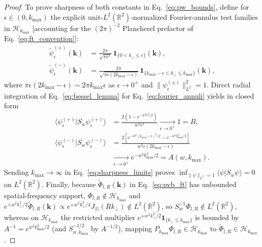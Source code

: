 \documentclass[aps,pra,reprint,nofootinbib,floatfix,longbibliography]{revtex4-2}
\theoremstyle{remark}
\newcommand{\braket}[2]{\langle #1 | #2 \rangle}
\newcommand{\norm}[1]{\lVert #1 \rVert}
\newcommand{\abs}[1]{\lvert #1 \rvert}
\begin{document}
\begin{proof}
To prove sharpness of both constants in Eq.~\eqref{eq:pw_bounds}, define for $\epsilon \in (0,k_{\max})$ the explicit unit-$L^2(\mathbb{R}^2)$-normalized Fourier-annulus test families in $\mathcal{H}_{k_{\max}}$ [accounting for the $(2\pi)^{-2}$ Plancherel prefactor of Eq.~\eqref{eq:ft_convention}]:
\begin{align}
\widetilde{\psi}_\epsilon^{(+)}(\mathbf{k}) &= \frac{2\pi}{\sqrt{\pi\epsilon^2}}\,\mathbf{1}_{\{0 < k_\perp \le \epsilon\}}(\mathbf{k}), \nonumber \\
\widetilde{\psi}_\epsilon^{(-)}(\mathbf{k}) &= \frac{2\pi}{\sqrt{\pi\epsilon(2k_{\max}-\epsilon)}}\,\mathbf{1}_{\{k_{\max}-\epsilon \le k_\perp \le k_{\max}\}}(\mathbf{k}),
\label{eq:fourier_annuli}
\end{align}
where $\pi\epsilon(2k_{\max}-\epsilon) \sim 2\pi k_{\max}\epsilon$ as $\epsilon \to 0^+$ and $\norm{\psi_\epsilon^{(\pm)}}_{L^2}^2 = 1$. Direct radial integration of Eq.~\eqref{eq:bessel_lemma} for Eq.~\eqref{eq:fourier_annuli} yields in closed form
\begin{align}
\braket{\psi_\epsilon^{(+)}}{S_w\psi_\epsilon^{(+)}} &= \frac{2\left(1 - e^{-w^2\epsilon^2/2}\right)}{w^2\epsilon^2} \xrightarrow[\epsilon\to 0^+]{} 1 = B, \nonumber \\
\braket{\psi_\epsilon^{(-)}}{S_w\psi_\epsilon^{(-)}} &= \frac{2\left[e^{-w^2(k_{\max}-\epsilon)^2/2} - e^{-w^2 k_{\max}^2/2}\right]}{w^2\epsilon(2k_{\max}-\epsilon)} \nonumber \\
&\xrightarrow[\epsilon\to 0^+]{} e^{-w^2 k_{\max}^2/2} = A(w,k_{\max}).
\label{eq:sharpness_limits}
\end{align}
Sending $k_{\max} \to \infty$ in Eq.~\eqref{eq:sharpness_limits} proves $\inf_{\norm{\psi}_{L^2}=1}\braket{\psi}{S_w\psi} = 0$ on $L^2(\mathbb{R}^2)$. Finally, because $\widetilde{\Phi}_{l,R}(\mathbf{k})$ in Eq.~\eqref{eq:pvb_ft} has unbounded spatial-frequency support, $\Phi_{l,R} \notin \mathcal{H}_{k_{\max}}$ and $e^{+w^2 k_\perp^2/2}\widetilde{\Phi}_{l,R}(\mathbf{k}) \propto e^{+w^2 k_\perp^2/4} J_{\abs{l}}(Rk_\perp) \notin L^2(\mathbb{R}^2)$, so $S_w^{-1}\Phi_{l,R} \notin L^2(\mathbb{R}^2)$, whereas on $\mathcal{H}_{k_{\max}}$ the restricted multiplier $e^{+w^2 k_\perp^2/2}\mathbf{1}_{\{k_\perp \le k_{\max}\}}$ is bounded by $A^{-1} = e^{w^2 k_{\max}^2/2}$ (and $S_{w,k_{\max}}^{-1/2}$ by $A^{-1/2}$), mapping $P_{k_{\max}}\Phi_{l,R} \in \mathcal{H}_{k_{\max}}$ to $\widetilde{\Phi}_{l,R} \in \mathcal{H}_{k_{\max}}$.
\end{proof}
\end{document}
